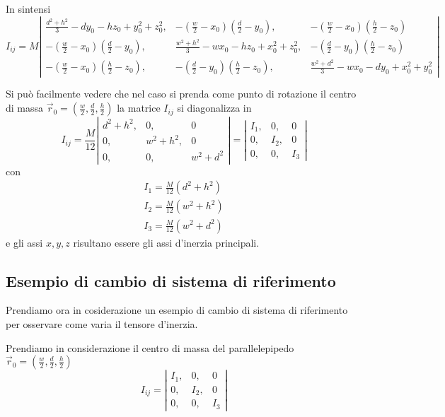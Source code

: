 \documentclass[a4paper,11pt]{article}
\begin{document}
In sintensi
\[
	I_{ij} = M
	\left|
\begin{array}{ccc}
	\frac{d^2+h^2}{3} - d y_0 - h z_0 + y_0 ^2 + z_0^2 ,
	& - \left( \frac{w}{2} - x_0 \right) \left( \frac{d}{2} - y_0 \right),
	& - \left( \frac{w}{2} - x_0 \right) \left( \frac{h}{2} - z_0 \right)
\\
	-\left( \frac{w}{2} - x_0 \right) \left( \frac{d}{2} - y_0 \right), 
	& \frac{w^2+h^2}{3} - w x_0 - h z_0 + x_0 ^2 + z_0^2,
	& - \left( \frac{d}{2} - y_0 \right) \left( \frac{h}{2} - z_0 \right)
\\
	-\left( \frac{w}{2} - x_0 \right) \left( \frac{h}{2} - z_0 \right),
	& -\left( \frac{d}{2} - y_0 \right) \left( \frac{h}{2} - z_0 \right),
	&  \frac{w^2+d^2}{3} -w x_0 - d y_0 + x_0 ^2 + y_0^2
\end{array}
	\right|
\]

Si può facilmente vedere che nel caso si prenda come punto di rotazione il centro di massa
$ \vec r_0 = \left( \frac{w}{2}, \frac{d}{2}, \frac{h}{2} \right) $ 
la matrice $ I_{ij}$ si diagonalizza in
\[
	I_{ij} = \frac{M}{12}
	\left|
\begin{array}{ccc}
	d^2 + h^2, & 0, & 0
\\
	0, & w^2 + h^2, & 0
\\
	0, & 0, & w^2 + d^2
\end{array}
	\right|
	=
	\left|
\begin{array}{ccc}
	I_1, &0, &0
\\
	0, & I_2, & 0
\\
	0, & 0, & I_3
\end{array}
	\right|
\]
con
\begin{eqnarray*}
	I_1 = \frac{M}{12}(d^2 + h^2)
\\
	I_2 = \frac{M}{12}(w^2 + h^2)
\\
	I_3 = \frac{M}{12}(w^2 + d^2) 
\end{eqnarray*}
e gli assi $ x, y, z $ risultano essere gli assi d'inerzia principali.


\subsection{Esempio di cambio di sistema di riferimento}

Prendiamo ora in cosiderazione un esempio di cambio di sistema di riferimento per osservare come
varia il tensore d'inerzia.

Prendiamo in considerazione il centro di massa del parallelepipedo $\vec r_0 = \left( \frac{w}{2},  \frac{d}{2},  \frac{h}{2} \right) $
\[
	I_{ij} =
	\left|
\begin{array}{ccc}
	I_1, &0, &0
\\
	0, & I_2, & 0
\\
	0, & 0, & I_3
\end{array}
	\right|
\]
\end{document}
